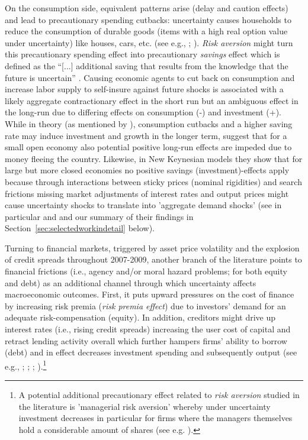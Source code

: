 \documentclass[a4paper,11pt,listof=nochaptergap,oneside,pointednumbers,bibtotoc,bigheadings,liststotoc]{scrbook}
\theoremstyle{mysatz}
\theoremstyle{mydefinition}
\theoremstyle{mytheorem}
\theoremstyle{mybemerkung}
\begin{document}
On the consumption side, equivalent patterns arise (delay and caution effects) and lead to precautionary spending cutbacks: uncertainty causes households to reduce the consumption of durable goods (items with a high real option value under uncertainty) like houses, cars, etc. (see e.g., \citealp{eberly:94}; \citealp{romer:90}). \textit{Risk aversion} might turn this precautionary spending effect into precautionary \textit{savings} effect which is defined as the ``[...] additional saving that results from the knowledge that the future is uncertain'' \citep[p. 2]{carrollandkimball:06}. Causing economic agents to cut back on consumption and increase labor supply to self-insure against future shocks is associated with a likely aggregate contractionary effect in the short run but an ambiguous effect in the long-run due to differing effects on consumption (-) and investment (+). While in theory (as mentioned by \citealp{bloom:14}), consumption cutbacks and a higher saving rate may induce investment and growth in the longer term, \citet{villaverdeetal:11} suggest that for a small open economy also potential positive long-run effects are impeded due to money fleeing the country. Likewise, in New Keynesian models they show that for large but more closed economies no positive savings (investment)-effects apply because through interactions between sticky prices (nominal rigidities) and search frictions missing market adjustments of interest rates and output prices might cause uncertainty shocks to translate into 'aggregate demand shocks' (see in particular \citealp{leducandliu:16} and \citealp{basuandbundick:17} and our summary of their findings in Section~\ref{sec:selectedworkindetail} below).

Turning to financial markets, triggered by asset price volatility and the explosion of credit spreads throughout 2007-2009, another branch of the literature points to financial frictions (i.e., agency and/or moral hazard problems; for both equity and debt) as an additional channel through which uncertainty affects macroeconomic outcomes. First, it puts upward pressures on the cost of finance by increasing risk premia (\textit{risk premia effect}) due to investors' demand for an adequate risk-compensation (equity). In addition, creditors might drive up interest rates (i.e., rising credit spreads) increasing the user cost of capital and retract lending activity overall which further hampers firms' ability to borrow (debt) and in effect decreases investment spending and subsequently output (see e.g., \citealp{gilchristetal:14}; \citealp{christianoetal:14}; \citealp{arenalloetal:11}; \citealp{arellanoetal:16}).\footnote{A potential additional precautionary effect related to \textit{risk aversion} studied in the literature is 'managerial risk aversion' whereby under uncertainty investment decreases in particular for firms where the managers themselves hold a considerable amount of shares (see e.g. \citealp{panousiandpananikolaou:12}).}\\
\end{document}
